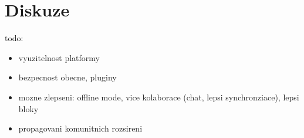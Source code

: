 \chapter{Diskuze}\label{text:diskuze}

todo\todo:

\begin{itemize}
    \item vyuzitelnost platformy
    \item bezpecnost obecne, pluginy
    \item mozne zlepseni: offline mode, vice kolaborace (chat, lepsi synchronziace), lepsi bloky
    \item propagovani komunitnich rozsireni
\end{itemize}